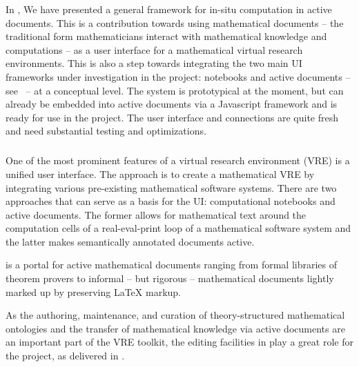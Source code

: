 In , We have presented a general framework for in-situ computation in active documents. This is
a contribution towards using mathematical documents -- the traditional form mathematicians
interact with mathematical knowledge and computations -- as a user interface for a
mathematical virtual research environments. This is also a step towards integrating the
two main UI frameworks under investigation in the \ODK project: \Jupyter notebooks and
active documents -- see~ -- at a conceptual level. The system is
prototypical at the moment, but can already be embedded into active documents via a
Javascript framework and is ready for use in the \ODK project. The user interface and \SCSCP
connections are quite fresh and need substantial testing and optimizations.


\subparagraph{}

One of the most prominent features of a virtual research environment (VRE) is a unified user interface. The \ODK approach is to create a mathematical VRE by integrating various pre-existing mathematical software systems. There are two approaches that can serve as a basis for the \ODK UI: computational notebooks and active documents. The former allows for mathematical text around the computation cells of a real-eval-print loop of a mathematical software system and the latter makes semantically annotated documents active.

\MathHub is a portal for active mathematical documents ranging from formal libraries of theorem provers to informal – but rigorous – mathematical documents lightly marked up by preserving LaTeX markup.

As the authoring, maintenance, and curation of theory-structured mathematical ontologies and the transfer of mathematical knowledge via active documents are an important part of the \ODK VRE toolkit, the editing facilities in \MathHub play a great role for the project,
as delivered in .

\subparagraph{}


